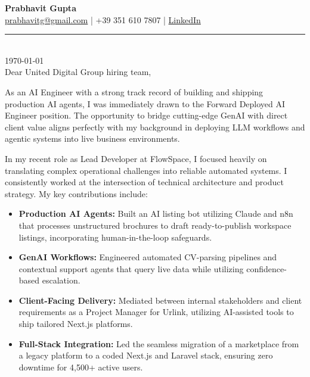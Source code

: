 \documentclass[11pt,a4paper]{article}
\begin{document}
{\Large \textbf{Prabhavit Gupta}} \\[1ex]
\href{mailto:prabhavitg@gmail.com}{prabhavitg@gmail.com} | +39 351 610 7807 | \href{https://www.linkedin.com/in/prabhavit/}{LinkedIn} \\[2ex]
\noindent\rule{\textwidth}{0.4pt} \\[2ex]


\today \\[2ex]

Dear United Digital Group hiring team,


As an AI Engineer with a strong track record of building and shipping production AI agents, I was immediately drawn to the Forward Deployed AI Engineer position. The opportunity to bridge cutting-edge GenAI with direct client value aligns perfectly with my background in deploying LLM workflows and agentic systems into live business environments.


In my recent role as Lead Developer at FlowSpace, I focused heavily on translating complex operational challenges into reliable automated systems. I consistently worked at the intersection of technical architecture and product strategy. My key contributions include:


\begin{itemize}
    \item \textbf{Production AI Agents:} Built an AI listing bot utilizing Claude and n8n that processes unstructured brochures to draft ready-to-publish workspace listings, incorporating human-in-the-loop safeguards.
    \item \textbf{GenAI Workflows:} Engineered automated CV-parsing pipelines and contextual support agents that query live data while utilizing confidence-based escalation.
    \item \textbf{Client-Facing Delivery:} Mediated between internal stakeholders and client requirements as a Project Manager for Urlink, utilizing AI-assisted tools to ship tailored Next.js platforms.
    \item \textbf{Full-Stack Integration:} Led the seamless migration of a marketplace from a legacy platform to a coded Next.js and Laravel stack, ensuring zero downtime for 4,500+ active users.
\end{itemize}
\vspace{6pt}
\end{document}
